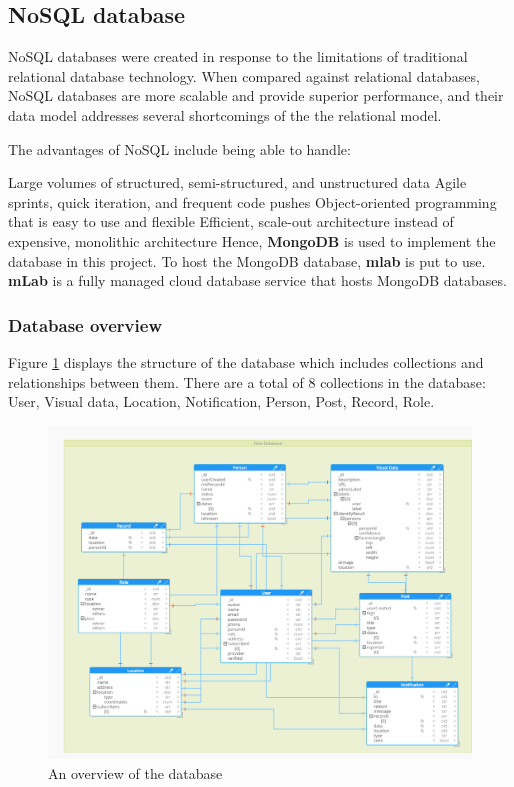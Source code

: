 \subsection{NoSQL database}
NoSQL databases were created in response to the limitations of traditional relational database technology. When compared against relational databases, NoSQL databases are more scalable and provide superior performance, and their data model addresses several shortcomings of the the relational model.

The advantages of NoSQL include being able to handle:

Large volumes of structured, semi-structured, and unstructured data
Agile sprints, quick iteration, and frequent code pushes
Object-oriented programming that is easy to use and flexible
Efficient, scale-out architecture instead of expensive, monolithic architecture
Hence, \textbf{MongoDB} is used to implement the database in this project. To host the MongoDB database, \textbf{mlab} is put to use. \textbf{mLab} is a fully managed cloud database service that hosts MongoDB databases.
\subsubsection{Database overview}
Figure \ref{chap4:database_overview} displays the structure of the database which includes collections and relationships between them.
There are a total of 8 collections in the database: User, Visual data, Location, Notification, Person, Post, Record, Role. 
\begin{center}
	\begin{figure}[H]
		\centering
		\includegraphics[width=1\columnwidth]{images/chap4/Model.png}
		\caption{An overview of the database}
		\label{chap4:database_overview}
	\end{figure}
\end{center}
\cleardoublepage
